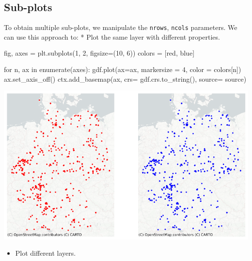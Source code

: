 \documentclass[
  letterpaper,
  DIV=11,
  numbers=noendperiod]{scrreprt}
\newenvironment{Shaded}{\begin{snugshade}}{\end{snugshade}}
\newcommand{\BuiltInTok}[1]{\textcolor[rgb]{0.00,0.23,0.31}{#1}}
\newcommand{\ControlFlowTok}[1]{\textcolor[rgb]{0.00,0.23,0.31}{#1}}
\newcommand{\DecValTok}[1]{\textcolor[rgb]{0.68,0.00,0.00}{#1}}
\newcommand{\KeywordTok}[1]{\textcolor[rgb]{0.00,0.23,0.31}{#1}}
\newcommand{\NormalTok}[1]{\textcolor[rgb]{0.00,0.23,0.31}{#1}}
\newcommand{\OperatorTok}[1]{\textcolor[rgb]{0.37,0.37,0.37}{#1}}
\newcommand{\StringTok}[1]{\textcolor[rgb]{0.13,0.47,0.30}{#1}}
\providecommand{\tightlist}{%
  \setlength{\itemsep}{0pt}\setlength{\parskip}{0pt}}\usepackage{longtable,booktabs,array}
\begin{document}
\subsection{Sub-plots}\label{sub-plots}

To obtain multiple sub-plots, we manipulate the \texttt{nrows},
\texttt{ncols} parameters. We can use this approach to: * Plot the same
layer with different properties.

\begin{Shaded}
\begin{Highlighting}[]
\NormalTok{fig, axes }\OperatorTok{=}\NormalTok{ plt.subplots(}\DecValTok{1}\NormalTok{, }\DecValTok{2}\NormalTok{, figsize}\OperatorTok{=}\NormalTok{(}\DecValTok{10}\NormalTok{, }\DecValTok{6}\NormalTok{))}
\NormalTok{colors }\OperatorTok{=}\NormalTok{ [}\StringTok{\textquotesingle{}red\textquotesingle{}}\NormalTok{, }\StringTok{\textquotesingle{}blue\textquotesingle{}}\NormalTok{]}

\ControlFlowTok{for}\NormalTok{ n, ax }\KeywordTok{in} \BuiltInTok{enumerate}\NormalTok{(axes):}
\NormalTok{    gdf.plot(ax}\OperatorTok{=}\NormalTok{ax, markersize }\OperatorTok{=} \DecValTok{4}\NormalTok{, color }\OperatorTok{=}\NormalTok{ colors[n])}
\NormalTok{    ax.set\_axis\_off()}
\NormalTok{    ctx.add\_basemap(ax, crs}\OperatorTok{=}\NormalTok{ gdf.crs.to\_string(), source}\OperatorTok{=}\NormalTok{ source)}
\end{Highlighting}
\end{Shaded}

\includegraphics{labs/w02_maps_files/figure-pdf/cell-20-output-1.png}

\begin{itemize}
\tightlist
\item
  Plot different layers.
\end{itemize}
\end{document}
